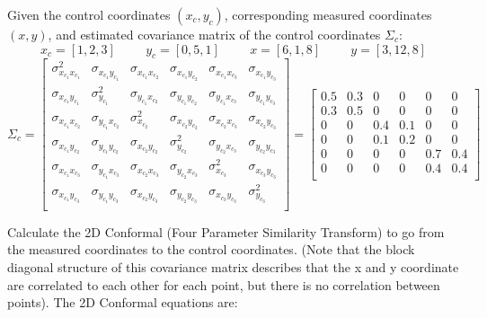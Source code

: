 Given the control coordinates $(x_c,y_c)$, corresponding measured coordinates $(x,y)$, and estimated covariance matrix of the control coordinates $\Sigma_c$: 
\[
x_c = [1,2,3] \hspace{1cm} y_c = [0, 5, 1]  \hspace{1cm} x = [6,1,8] \hspace{1cm} y = [3,12,8]
\]
\[
\Sigma_c = 
 \begin{bmatrix}
\sigma_{x_{c_1}x_{c_1}}^2 & \sigma_{x_{c_1}y_{c_1}} & \sigma_{x_{c_1}x_{c_2}} & \sigma_{x_{c_1}y_{c_2}} & \sigma_{x_{c_1}x_{c_3}} & \sigma_{x_{c_1}y_{c_3}}  \\ 
\sigma_{x_{c_1}y_{c_1}} & \sigma_{y_{c_1}}^2 & \sigma_{y_{c_1}x_{c_2}} & \sigma_{y_{c_1}y_{c_2}} & \sigma_{y_{c_1}x_{c_3}} & \sigma_{y_{c_1}y_{c_3}}  \\ 
\sigma_{x_{c_1}x_{c_2}} & \sigma_{y_{c_1}x_{c_2}} & \sigma_{x_{c_2}}^2 & \sigma_{x_{c_2}y_{c_2}} & \sigma_{x_{c_2}x_{c_3}} & \sigma_{x_{c_2}y_{c_3}}  \\ 
\sigma_{x_{c_1}y_{c_2}} & \sigma_{y_{c_1}y_{c_2}} & \sigma_{x_{c_2}y_{c_2}} & \sigma_{y_{c_2}}^2 & \sigma_{y_{c_2}x_{c_3}} & \sigma_{y_{c_2}y_{c_3}}  \\ 
\sigma_{x_{c_1}x_{c_3}} & \sigma_{y_{c_1}x_{c_3}} & \sigma_{x_{c_2}x_{c_3}} & \sigma_{y_{c_2}x_{c_3}} & \sigma_{x_{c_3}}^2 & \sigma_{x_{c_3}y_{c_3}}  \\ 
\sigma_{x_{c_1}y_{c_3}} & \sigma_{y_{c_1}y_{c_3}} & \sigma_{x_{c_2}y_{c_3}} & \sigma_{y_{c_2}y_{c_3}} & \sigma_{x_{c_3}y_{c_3}} & \sigma_{y_{c_3}}^2  \\ 
 \end{bmatrix}
 = 
 \begin{bmatrix}
 0.5 & 0.3 & 0 & 0 & 0 & 0 \\
 0.3 & 0.5 & 0 & 0 & 0 & 0 \\
 0 & 0 & 0.4 & 0.1 & 0 & 0 \\
 0 & 0 & 0.1 & 0.2 & 0 & 0 \\
 0 & 0 & 0 & 0 & 0.7 & 0.4 \\
 0 & 0 & 0 & 0 & 0.4 & 0.4 \\
 \end{bmatrix} 
\]

Calculate the 2D Conformal (Four Parameter Similarity Transform) to go from the measured coordinates to the control coordinates.  (Note that the block diagonal structure of this covariance matrix describes that the x and y coordinate are correlated to each other for each point, but there is no correlation between points).  The 2D Conformal equations are:

